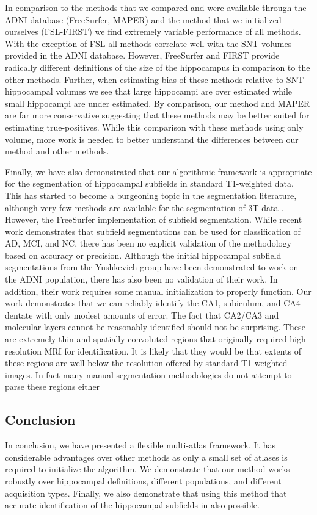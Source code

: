 \documentclass{article}\usepackage{graphicx, color}
\begin{document}
In comparison to the methods that we compared and were available through the
ADNI database (FreeSurfer, MAPER) and the method that we initialized ourselves
(FSL-FIRST) we find extremely variable performance of all methods.  With the
exception of FSL all methods correlate well with the SNT volumes provided in
the ADNI database.  However, FreeSurfer and FIRST provide radically different
definitions of the size of the hippocampus in comparison to the other methods.
Further, when estimating bias of these methods relative to SNT hippocampal
volumes we see that large hippocampi are over estimated while small hippocampi
are under estimated.  By comparison, our method and MAPER are far more
conservative suggesting that these methods may be better suited for estimating
true-positives.  While this comparison with these methods using only volume,
more work is needed to better understand the differences between our method and
other methods.

Finally, we have also demonstrated that our algorithmic framework is appropriate
for the segmentation of hippocampal subfields in standard T1-weighted data.
This has started to become a burgeoning topic in the segmentation literature,
although very few methods are available for the segmentation of 3T data
\citep{Yushkevich2009,VanLeemput2009}. However, the FreeSurfer implementation of
subfield segmentation. While recent work demonstrates that subfield
segmentations can be used for classification of AD, MCI, and NC, there has been
no explicit validation of the methodology based on accuracy or precision.
Although the initial hippocampal subfield segmentations from the Yushkevich
group have been demonstrated to work on the ADNI population, there has also been
no validation of their work.  In addition, their work requires some manual
initialization to properly function.  Our work demonstrates that we can reliably
identify the CA1, subiculum, and CA4 dentate with only modest amounts of error.
The fact that CA2/CA3 and molecular layers cannot be reasonably identified
should not be surprising.  These are extremely thin and spatially convoluted
regions that originally required high-resolution MRI for identification.  It is
likely that they would be that extents of these regions are well below the
resolution offered by standard T1-weighted images.  In fact many manual
segmentation methodologies do not attempt to parse these regions either
\citep{Wisse2012, Mueller2009}

\subsection{Conclusion}
In conclusion, we have presented a flexible multi-atlas framework.  It has
considerable advantages over other methods as only a small set of atlases is
required to initialize the algorithm.  We demonstrate that our method works
robustly over hippocampal definitions, different populations, and different
acquisition types.  Finally, we also demonstrate that using this method that
accurate identification of the hippocampal subfields in also possible.
\end{document}
